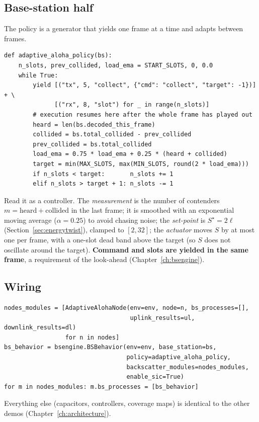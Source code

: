\subsection{Base-station half}
The policy is a generator that yields one frame at a time and adapts between frames.
\begin{lstlisting}
def adaptive_aloha_policy(bs):
    n_slots, prev_collided, load_ema = START_SLOTS, 0, 0.0
    while True:
        yield [("tx", 5, "collect", {"cmd": "collect", "target": -1})] + \
              [("rx", 8, "slot") for _ in range(n_slots)]
        # execution resumes here after the whole frame has played out
        heard = len(bs.decoded_this_frame)
        collided = bs.total_collided - prev_collided
        prev_collided = bs.total_collided
        load_ema = 0.75 * load_ema + 0.25 * (heard + collided)
        target = min(MAX_SLOTS, max(MIN_SLOTS, round(2 * load_ema)))
        if n_slots < target:       n_slots += 1
        elif n_slots > target + 1: n_slots -= 1
\end{lstlisting}
Read it as a controller. The \emph{measurement} is the number of contenders $m=\text{heard}+\text{collided}$ in the last frame; it is smoothed with an exponential moving average ($\alpha=0.25$) to avoid chasing noise; the \emph{set-point} is $S^\star=2\ell$ (Section~\ref{sec:energytwist}), clamped to $[2,32]$; the \emph{actuator} moves $S$ by at most one per frame, with a one-slot dead band above the target (so $S$ does not oscillate around the target). \textbf{Command and slots are yielded in the same frame}, a requirement of the look-ahead (Chapter~\ref{ch:bsengine}).

\subsection{Wiring}
\begin{lstlisting}
nodes_modules = [AdaptiveAlohaNode(env=env, node=n, bs_processes=[],
                                   uplink_results=ul, downlink_results=dl)
                 for n in nodes]
bs_behavior = bsengine.BSBehavior(env=env, base_station=bs,
                                  policy=adaptive_aloha_policy,
                                  backscatter_modules=nodes_modules,
                                  enable_sic=True)
for m in nodes_modules: m.bs_processes = [bs_behavior]
\end{lstlisting}
Everything else (capacitors, controllers, coverage maps) is identical to the other demos (Chapter~\ref{ch:architecture}).

